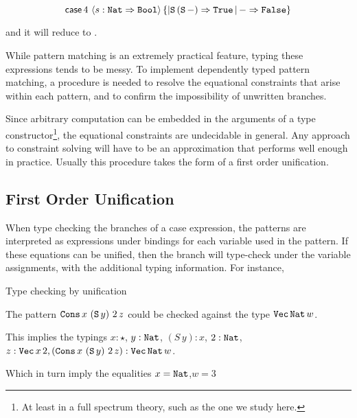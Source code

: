 \[
\mathsf{case}{}\,4\,\left\langle s:\mathtt{Nat}{}\Rightarrow\mathtt{Bool}{}\right\rangle \left\{ |\mathtt{S}{}\left(\mathtt{S}{}\,-\right)\Rightarrow \mathtt{True}{}\,|\,-\Rightarrow \mathtt{False}{}\right\} 
\]

and it will reduce to \True{}.

While pattern matching is an extremely practical feature, typing these expressions tends to be messy.
To implement dependently typed pattern matching, a procedure is needed to resolve the equational constraints that arise within each pattern, and to confirm the impossibility of unwritten branches.

Since arbitrary computation can be embedded in the arguments of a type constructor\footnote{
  At least in a full spectrum theory, such as the one we study here.
  }, the equational constraints are undecidable in general.
Any approach to constraint solving will have to be an approximation that performs well enough in practice.
Usually this procedure takes the form of a first order unification. 




\subsection{First Order Unification}

When type checking the branches of a case expression, the patterns are interpreted as expressions under bindings for each variable used in the pattern.
If these equations can be unified, then the branch will type-check under the variable assignments, with the additional typing information.
For instance,
\begin{example}
Type checking by unification

The pattern $\mathtt{Cons}{}\,x\,\left(\mathtt{S}{}\,y\right)\,2\,z$ could be checked against the type $\mathtt{Vec}{}\,\mathtt{Nat}{}\,w$.

This implies the typings $x:\star$, $y:\mathtt{Nat}{}$, $\left(S\,y\right):x$, $2:\mathtt{Nat}{}$, $z:\mathtt{Vec}{}\,x\,2,\left(\mathtt{Cons}{}\,x\,\left(\mathtt{S}{}\,y\right)\,2\,z\right):\mathtt{Vec}{}\,\mathtt{Nat}{}\,w$.

Which in turn imply the equalities $x=\mathtt{Nat}{}$,$w=3$
\end{example}

